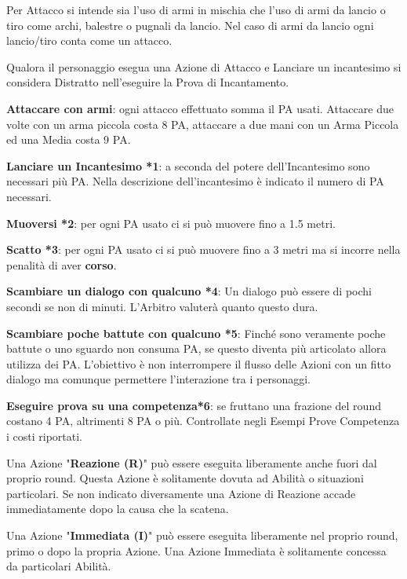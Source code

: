 \documentclass[12pt,a4paper,twoside,openany]{book}
\begin{document}
\medskip

Per Attacco si intende sia l'uso di armi in mischia che l'uso di armi da lancio o tiro come archi, balestre o pugnali da lancio. Nel caso di armi da lancio ogni lancio/tiro conta come un attacco.

Qualora il personaggio esegua una Azione di Attacco e Lanciare un incantesimo si considera Distratto nell'eseguire la Prova di Incantamento.

\begin{multicols}{2}
	
\textbf{Attaccare con armi}: ogni attacco effettuato somma il PA usati. Attaccare due volte con un arma piccola costa 8 PA, attaccare a due mani con un Arma Piccola ed una Media costa 9 PA.

\textbf{Lanciare un Incantesimo *1}: a seconda del potere dell'Incantesimo sono necessari più PA. Nella descrizione dell'incantesimo è indicato il numero di PA necessari. 

\textbf{Muoversi *2}: per ogni PA usato ci si può muovere fino a 1.5 metri.

\textbf{Scatto *3}: per ogni PA usato ci si può muovere fino a 3 metri ma si incorre nella penalità di aver \textbf{corso}.

\textbf{Scambiare un dialogo con qualcuno *4}: Un dialogo può essere di pochi secondi se non di minuti. L'Arbitro valuterà quanto questo dura.

\textbf{Scambiare poche battute con qualcuno *5}: Finché sono veramente poche battute o uno sguardo non consuma PA, se questo diventa più articolato allora utilizza dei PA. L'obiettivo è non interrompere il flusso delle Azioni con un fitto dialogo ma comunque permettere l'interazione tra i personaggi.

\textbf{Eseguire prova su una competenza*6}: se fruttano una frazione del round costano 4 PA, altrimenti 8 PA o più. Controllate negli Esempi Prove Competenza i costi riportati.

Una Azione "\textbf{Reazione (R)}" può essere eseguita liberamente anche fuori dal proprio round. Questa Azione è solitamente dovuta ad Abilità o situazioni particolari. Se non indicato diversamente una Azione di Reazione accade immediatamente dopo la causa che la scatena.

Una Azione "\textbf{Immediata (I)}" può essere eseguita liberamente nel proprio round, primo o dopo la propria Azione. Una Azione Immediata è solitamente concessa da particolari Abilità.


\end{multicols}
\end{document}
